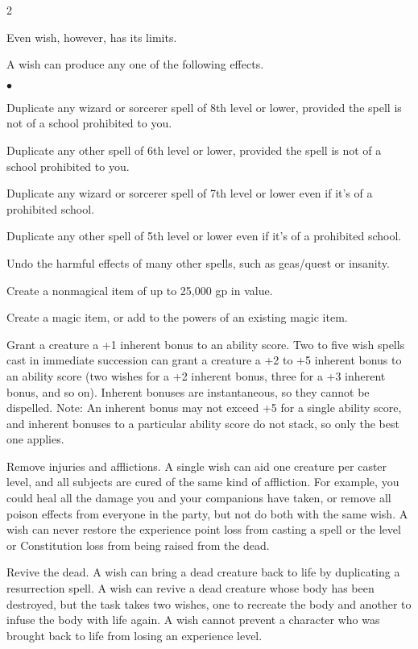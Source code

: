 \begin{multicols}{2}
\begin{small}
\smallskip\noindent Even wish, however, has its limits.

\smallskip\noindent A wish can produce any one of the following effects.

\begin{list}{$\bullet$}{\itemspace}
  \item Duplicate any wizard or sorcerer spell of 8th level or lower, provided the spell is not of a school prohibited to you.
  \item Duplicate any other spell of 6th level or lower, provided the spell is not of a school prohibited to you.
  \item Duplicate any wizard or sorcerer spell of 7th level or lower even if it's of a prohibited school.
  \item Duplicate any other spell of 5th level or lower even if it's of a prohibited school. 
  \item Undo the harmful effects of many other spells, such as geas/quest or insanity.
  \item Create a nonmagical item of up to 25,000 gp in value.
  \item Create a magic item, or add to the powers of an existing magic item.
  \item Grant a creature a +1 inherent bonus to an ability score. Two to five wish spells cast in immediate succession can grant a creature a +2 to +5 inherent bonus to an ability score (two wishes for a +2 inherent bonus, three for a +3 inherent bonus, and so on). Inherent bonuses are instantaneous, so they cannot be dispelled. Note: An inherent bonus may not exceed +5 for a single ability score, and inherent bonuses to a particular ability score do not stack, so only the best one applies.
  \item Remove injuries and afflictions. A single wish can aid one creature per caster level, and all subjects are cured of the same kind of affliction. For example, you could heal all the damage you and your companions have taken, or remove all poison effects from everyone in the party, but not do both with the same wish. A wish can never restore the experience point loss from casting a spell or the level or Constitution loss from being raised from the dead.
  \item Revive the dead. A wish can bring a dead creature back to life by duplicating a resurrection spell. A wish can revive a dead creature whose body has been destroyed, but the task takes two wishes, one to recreate the body and another to infuse the body with life again. A wish cannot prevent a character who was brought back to life from losing an experience level.

\end{list}
\end{small}
\end{multicols}
